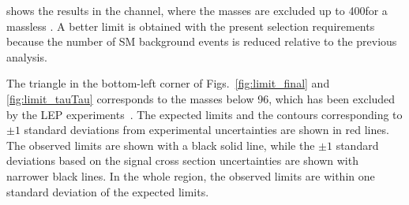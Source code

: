shows the results in the \tauTau channel, where the \chione masses are excluded up to 400\GeV for a massless \PSGczDo. 
A better limit is obtained with the present selection requirements because the number of SM background events is reduced relative to the previous analysis.

The triangle in the bottom-left corner of Figs.~\ref{fig:limit_final} and 
\ref{fig:limit_tauTau} corresponds to the \sTau masses below 96\GeV, which has been excluded by the LEP experiments~\cite{lepsusy}.
The expected limits and the contours corresponding to $\pm 1$ standard deviations from experimental uncertainties are shown in red lines. 
The observed limits are shown with a black solid line, 
while the $\pm 1$ standard deviations based on the signal cross section uncertainties are shown with narrower black lines.
In the whole region, the observed limits are within one standard deviation of the expected limits.  


